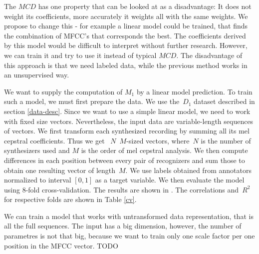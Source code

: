 \par
{}
The $MCD$ has one property that can be looked at as a disadvantage: It does not weight its coefficients, more accurately it weights all with the same weights. We propose to change this - for example a linear model could be trained, that finds the combination of MFCC's that corresponds the best. The coefficients derived by this model would be difficult to interpret without further research. However, we can train it and try to use it instead of typical $MCD$. The disadvantage of this approach is that we need labeled data, while the previous method works in an unsupervised way.
\par
We want to supply the computation of $M_1$ by a linear model prediction. To train such a model, we must first prepare the data. We use the~$D_1$ dataset described in section \ref{data-desc}. Since we want to use a simple linear model, we need to work with fixed size vectors. Nevertheless, the input data are variable-length sequences of vectors. We first transform each synthesized recording by summing all its mel cepstral coefficients. Thus we get ~$N$~$M$-sized vectors, where~$N$ is the number of synthesizers used and $M$ is the order of mel cepstral analysis. We then compute differences in each position between every pair of recognizers and sum those to obtain one resulting vector of length~$M$. We use labels obtained from annotators normalized to interval $[0, 1]$ as a target variable. We then evaluate the model using 8-fold cross-validation. The results are shown in . The correlations and~$R^2$ for respective folds are shown in Table \ref{cv}.
\par
We can train a model that works with untransformed data representation, that is all the full sequences. The input has a big dimension, however, the number of parametres is not that big, because we want to train only one scale factor per one position in the MFCC vector. TODO
